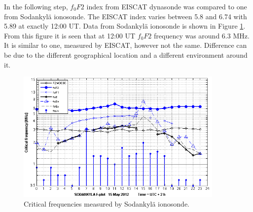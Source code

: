\documentclass{article}
\begin{document}
In the following step, $f_0F2$ index from EISCAT dynasonde was compared to one from Sodankyl\"a ionosonde. The EISCAT index varies between 5.8 and 6.74 with 5.89 at exactly 12:00 UT. Data from Sodankyl\"a ionosonde is shown in Figure \ref{fig:sodankyla}. From this figure it is seen that at 12:00 UT $f_0F2$ frequency was around 6.3 MHz. It is similar to one, measured by EISCAT, however not the same. Difference can be due to the different geographical location and a different environment around it.

\begin{figure}[h!tb]
	\centering
	\includegraphics[width=0.9\textwidth]{Figures/sodankyla.png}
	\caption{Critical frequencies measured by Sodankyl\"a ionosonde.}
	\label{fig:sodankyla}
\end{figure}
\end{document}
